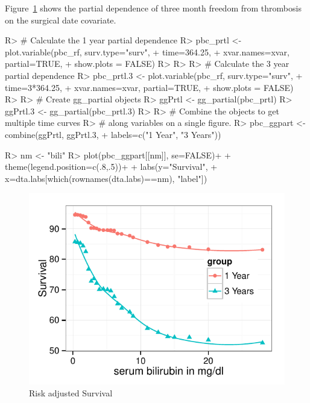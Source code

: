 \documentclass[nojss]{jss}\usepackage[]{graphicx}\usepackage[]{color}
\makeatletter
\def\maxwidth{ %
  \ifdim\Gin@nat@width>\linewidth
    \linewidth
  \else
    \Gin@nat@width
  \fi
}
\makeatother
\begin{document}
Figure~\ref{fig:pbc-partial-bili} shows the partial dependence of three month freedom from thrombosis on the surgical date covariate. 

\begin{Schunk}
\begin{Sinput}
R> # Calculate the 1 year partial dependence
R> pbc_prtl <- plot.variable(pbc_rf, surv.type="surv",
+                           time=364.25, 
+                       xvar.names=xvar, partial=TRUE,
+                       show.plots = FALSE)
R> 
R> 
R> # Calculate the 3 year partial dependence
R> pbc_prtl.3 <- plot.variable(pbc_rf, surv.type="surv", 
+                             time=3*364.25, 
+                       xvar.names=xvar, partial=TRUE,
+                       show.plots = FALSE)
R> 
R> # Create gg_partial objects
R> ggPrtl <- gg_partial(pbc_prtl)
R> ggPrtl.3 <- gg_partial(pbc_prtl.3)
R> 
R> # Combine the objects to get multiple time curves 
R> # along variables on a single figure.
R> pbc_ggpart <- combine(ggPrtl, ggPrtl.3, 
+                       labels=c("1 Year", "3 Years"))
\end{Sinput}
\end{Schunk}




\begin{Schunk}
\begin{Sinput}
R> nm  <- "bili"
R> plot(pbc_ggpart[[nm]], se=FALSE)+
+   theme(legend.position=c(.8,.5))+
+   labs(y="Survival", 
+        x=dta.labs[which(rownames(dta.labs)==nm), "label"])
\end{Sinput}
\begin{figure}[!htpb]

{\centering \includegraphics[width=\maxwidth]{figure/rfs-pbc-partial-bili-1} 

}

\caption[Risk adjusted Survival]{Risk adjusted Survival\label{fig:pbc-partial-bili}}
\end{figure}
\end{Schunk}
\end{document}
